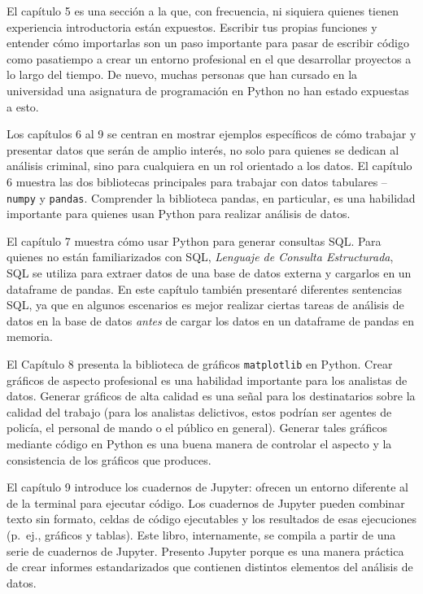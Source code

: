 \documentclass[
  letterpaper,
]{scrbook}
\begin{document}
El capítulo 5 es una sección a la que, con frecuencia, ni siquiera
quienes tienen experiencia introductoria están expuestos. Escribir tus
propias funciones y entender cómo importarlas son un paso importante
para pasar de escribir código como pasatiempo a crear un entorno
profesional en el que desarrollar proyectos a lo largo del tiempo. De
nuevo, muchas personas que han cursado en la universidad una asignatura
de programación en Python no han estado expuestas a esto.

Los capítulos 6 al 9 se centran en mostrar ejemplos específicos de cómo
trabajar y presentar datos que serán de amplio interés, no solo para
quienes se dedican al análisis criminal, sino para cualquiera en un rol
orientado a los datos. El capítulo 6 muestra las dos bibliotecas
principales para trabajar con datos tabulares -- \texttt{numpy} y
\texttt{pandas}. Comprender la biblioteca pandas, en particular, es una
habilidad importante para quienes usan Python para realizar análisis de
datos.

El capítulo 7 muestra cómo usar Python para generar consultas SQL. Para
quienes no están familiarizados con SQL, \emph{Lenguaje de Consulta
Estructurada}, SQL se utiliza para extraer datos de una base de datos
externa y cargarlos en un dataframe de pandas. En este capítulo también
presentaré diferentes sentencias SQL, ya que en algunos escenarios es
mejor realizar ciertas tareas de análisis de datos en la base de datos
\emph{antes} de cargar los datos en un dataframe de pandas en memoria.

El Capítulo 8 presenta la biblioteca de gráficos \texttt{matplotlib} en
Python. Crear gráficos de aspecto profesional es una habilidad
importante para los analistas de datos. Generar gráficos de alta calidad
es una señal para los destinatarios sobre la calidad del trabajo (para
los analistas delictivos, estos podrían ser agentes de policía, el
personal de mando o el público en general). Generar tales gráficos
mediante código en Python es una buena manera de controlar el aspecto y
la consistencia de los gráficos que produces.

El capítulo 9 introduce los cuadernos de Jupyter: ofrecen un entorno
diferente al de la terminal para ejecutar código. Los cuadernos de
Jupyter pueden combinar texto sin formato, celdas de código ejecutables
y los resultados de esas ejecuciones (p.~ej., gráficos y tablas). Este
libro, internamente, se compila a partir de una serie de cuadernos de
Jupyter. Presento Jupyter porque es una manera práctica de crear
informes estandarizados que contienen distintos elementos del análisis
de datos.
\end{document}
